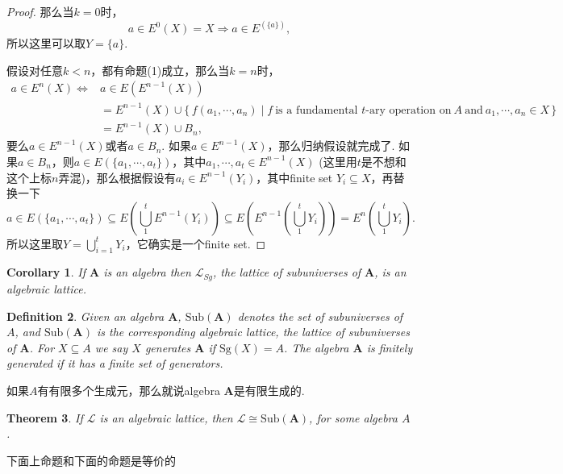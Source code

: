 \documentclass{article}
\newtheorem{theorem}{Theorem}[section]
\newtheorem{corollary}[theorem]{Corollary}
\newtheorem{definition}[theorem]{Definition}
\newcommand\Set[2]{\{\,#1\mid#2\,\}} %
\newcommand\lattice{\mathcal{L}}
\newcommand\Sg{\text{Sg}}
\newcommand\algebra{\mathbf{A}}
\newcommand\Sub[1]{\text{Sub}(#1)}
\begin{document}
\begin{proof}
那么当$k=0$时，
$$
a \in E^0(X) = X  \Rightarrow a \in E^(\{a\}),
$$
所以这里可以取$Y = \{a\}$.

假设对任意$k < n$，都有命题(1)成立，那么当$k=n$时，
$$
\begin{aligned}
a \in E^n(X) \Leftrightarrow& a \in E(E^{n-1}(X))\\ &= E^{n-1}(X) \cup \Set{f(a_1,\cdots,a_n)}{f\ \text{is a fundamental $t$-ary operation on}\ A\ \text{and}\ a_1,\cdots,a_n \in X}\\ &= E^{n-1}(X) \cup B_n,
\end{aligned}
$$
要么$a \in E^{n-1}(X)$或者$a \in B_n$. 如果$a \in E^{n-1}(X)$，那么归纳假设就完成了. 如果$a \in B_n$，则$a \in E(\{a_1,\cdots,a_t\})$，其中$a_1,\cdots,a_t \in E^{n-1}(X)$ (这里用$t$是不想和这个上标$n$弄混)，那么根据假设有$a_i \in E^{n-1}(Y_i)$，其中finite set $Y_i \subseteq X$，再替换一下
$$
a \in E(\{a_1,\cdots,a_t\}) \subseteq  E(\bigcup\limits_{1}^{t} E^{n-1}(Y_i))  \subseteq E(E^{n-1}(\bigcup\limits_{1}^{t} Y_i)) = E^n(\bigcup\limits_{1}^{t} Y_i).
$$
所以这里取$Y = \bigcup\limits_{i=1}^{t} Y_i$，它确实是一个finite set.

\end{proof}

\begin{corollary}
\rm If $\mathbf{A}$ is an algebra then $\mathcal{L}_{Sg}$, the lattice of subuniverses of $\mathbf{A}$, is an algebraic lattice.
\end{corollary}

\newpage
\begin{definition}
\rm Given an algebra $\algebra$, {\color{red} $\Sub{\algebra}$} denotes the set of subuniverses of $A$, and $\Sub{\algebra}$ is the corresponding algebraic lattice, the lattice of subuniverses of $\algebra$. For $X \subseteq A$ we say $X$ generates $\algebra$ if $\Sg(X) = A$. The algebra $\algebra$ is finitely generated if it has a finite set of generators.
\end{definition}

{\color{blue} 如果$A$有有限多个生成元，那么就说algebra $\algebra$是有限生成的}.

\begin{theorem}
\rm If $\lattice$ is an algebraic lattice, then $\lattice \cong \Sub{\algebra}$, for some algebra $A$.
\end{theorem}

下面上命题和下面的命题是等价的
\end{document}
